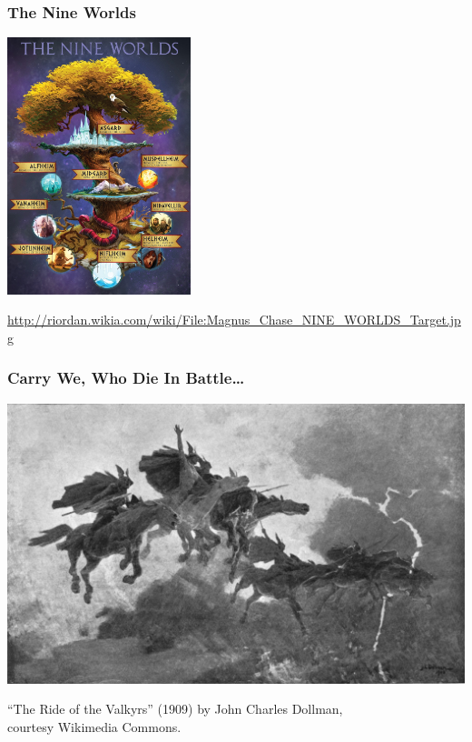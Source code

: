 \begin{frame}[fragile]
\frametitle{The Nine Worlds}
\begin{center}
\includegraphics[width=0.4\textwidth]{images/ninerealms.jpg}
\end{center}

\url{http://riordan.wikia.com/wiki/File:Magnus_Chase_NINE_WORLDS_Target.jpg}
\end{frame}

\begin{frame}
\frametitle{Carry We, Who Die In Battle\ldots}

\begin{center}
\includegraphics[height=.8\textheight]{images/L10-ride-of-the-valkyrs.jpg}

``The Ride of the Valkyrs'' (1909) by John Charles Dollman, \\
courtesy Wikimedia Commons.
\end{center}
\end{frame}

